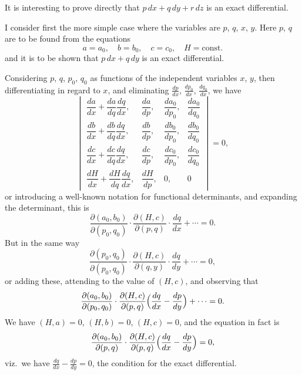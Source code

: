 \documentclass[11pt,a4paper]{book}
\begin{document}
It is interesting to prove directly that $p\,dx + q\,dy + r\,dz$ is an exact differential.

I consider first the more simple case where the variables are $p$, $q$, $x$, $y$. Here $p$, $q$ are to be found from the equations
\[
a = a_0, \quad b = b_0, \quad c = c_0, \quad H = \text{const.}
\]
and it is to be shown that $p\,dx + q\,dy$ is an exact differential.

Considering $p$, $q$, $p_0$, $q_0$ as functions of the independent variables $x$, $y$, then differentiating in regard to $x$, and eliminating $\frac{dp}{dx}$, $\frac{dp_0}{dx}$, $\frac{dq_0}{dx}$, we have
\[
\begin{vmatrix}
\dfrac{da}{dx} + \dfrac{da}{dq}\dfrac{dq}{dx}, & \dfrac{da}{dp}, & \dfrac{da_0}{dp_0}, & \dfrac{da_0}{dq_0} \\[6pt]
\dfrac{db}{dx} + \dfrac{db}{dq}\dfrac{dq}{dx}, & \dfrac{db}{dp}, & \dfrac{db_0}{dp_0}, & \dfrac{db_0}{dq_0} \\[6pt]
\dfrac{dc}{dx} + \dfrac{dc}{dq}\dfrac{dq}{dx}, & \dfrac{dc}{dp}, & \dfrac{dc_0}{dp_0}, & \dfrac{dc_0}{dq_0} \\[6pt]
\dfrac{dH}{dx} + \dfrac{dH}{dq}\dfrac{dq}{dx}, & \dfrac{dH}{dp}, & 0, & 0
\end{vmatrix} = 0,
\]
or introducing a well-known notation for functional determinants, and expanding the determinant, this is
\[
\frac{\partial(a_0, b_0)}{\partial(p_0, q_0)} \cdot \frac{\partial(H, c)}{\partial(p, q)} \cdot \frac{dq}{dx} + \cdots = 0.
\]
But in the same way
\[
\frac{\partial(p_0, q_0)}{\partial(p_0, q_0)} \cdot \frac{\partial(H, c)}{\partial(q, y)} \cdot \frac{dq}{dy} + \cdots = 0,
\]
or adding these, attending to the value of $(H, c)$, and observing that
\[
\frac{\partial(a_0, b_0)}{\partial(p_0, q_0)} \cdot \frac{\partial(H, c)}{\partial(p, q)} \Bigl(\frac{dq}{dx} - \frac{dp}{dy}\Bigr) + \cdots = 0.
\]
We have $(H, a) = 0$, $(H, b) = 0$, $(H, c) = 0$, and the equation in fact is
\[
\frac{\partial(a_0, b_0)}{\partial(p, q)} \cdot \frac{\partial(H, c)}{\partial(p, q)} \Bigl(\frac{dq}{dx} - \frac{dp}{dy}\Bigr) = 0,
\]
viz.~we have $\frac{dq}{dx} - \frac{dp}{dy} = 0$, the condition for the exact differential.
\end{document}
